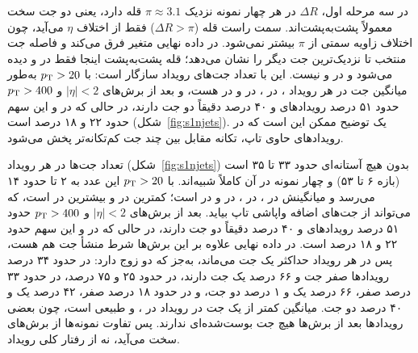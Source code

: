 در سه مرحله اول، $\Delta R$ در هر چهار نمونه نزدیک $\pi\approx3.1$ قله دارد، یعنی دو جت سخت معمولاً پشت‌به‌پشت‌اند. سمت راست قله ($\Delta R>\pi$) فقط از اختلاف $\eta$ می‌آید، چون اختلاف زاویه سمتی از $\pi$ بیشتر نمی‌شود. در داده نهایی متغیر فرق می‌کند و فاصله جت منتخب تا نزدیک‌ترین جت دیگر را نشان می‌دهد؛ قله پشت‌به‌پشت اینجا فقط در \Zjet و \bbbb دیده می‌شود و در \ttZ و \ttbb نیست. این با تعداد جت‌های رویداد سازگار است: با $p_\mathrm{T}>20$ به‌طور میانگین  جت در هر رویداد \Zjet،  در \bbbb،  در \ttZ و  در \ttbb هست، و بعد از برش‌های $|\eta|<2$ و $p_\mathrm{T}>400$ حدود ۵۱ درصد رویدادهای \Zjet و ۴۰ درصد \bbbb دقیقاً دو جت دارند، در حالی که در \ttZ و \ttbb این سهم حدود ۲۲ و ۱۸ درصد است (شکل~\ref{fig:s1njets}). یک توضیح ممکن این است که در رویدادهای حاوی تاپ، تکانه مقابل بین چند جت کم‌تکانه‌تر پخش می‌شود.

تعداد جت‌ها در هر رویداد (شکل~\ref{fig:s1njets}) بدون هیچ آستانه‌ای حدود ۳۳ تا ۳۵ است (بازه ۶ تا ۵۳) و چهار نمونه در آن کاملاً شبیه‌اند. با $p_\mathrm{T}>20$ این عدد به ۲ تا حدود ۱۴ می‌رسد و میانگینش  در \Zjet،  در \bbbb،  در \ttZ و  در \ttbb است؛ کمترین در \Zjet و بیشترین در \ttbb است، که می‌تواند از جت‌های اضافه واپاشی تاپ بیاید. بعد از برش‌های $|\eta|<2$ و $p_\mathrm{T}>400$ حدود ۵۱ درصد رویدادهای \Zjet و ۴۰ درصد \bbbb دقیقاً دو جت دارند، در حالی که در \ttZ و \ttbb این سهم حدود ۲۲ و ۱۸ درصد است. در داده نهایی علاوه بر این برش‌ها شرط منشأ جت هم هست، پس در هر رویداد حداکثر یک جت می‌ماند، به‌جز \bbbb که دو زوج \bq{} دارد: در \Zjet حدود ۳۴ درصد رویدادها صفر جت و ۶۶ درصد یک جت دارند، در \ttZ حدود ۲۵ و ۷۵ درصد، در \ttbb حدود ۳۳ درصد صفر، ۶۶ درصد یک و ۱ درصد دو جت، و در \bbbb حدود ۱۸ درصد صفر، ۴۲ درصد یک و ۴۰ درصد دو جت. میانگین کمتر از یک جت در رویداد در \Zjet، \ttZ و \ttbb طبیعی است، چون بعضی رویدادها بعد از برش‌ها هیچ جت بوست‌شده‌ای ندارند. پس تفاوت نمونه‌ها از برش‌های سخت می‌آید، نه از رفتار کلی رویداد.
